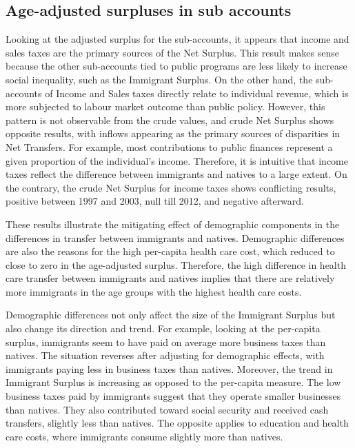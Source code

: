 \subsection{Age-adjusted surpluses in sub accounts}

Looking at the adjusted surplus for the sub-accounts, it appears that income and sales taxes are the primary sources of the Net Surplus.
This result makes sense because the other sub-accounts tied to public programs are less likely to increase social inequality, such as the Immigrant Surplus.
On the other hand, the sub-accounts of Income and Sales taxes directly relate to individual revenue, which is more subjected to labour market outcome than public policy.
However, this pattern is not observable from the crude values, and crude Net Surplus shows opposite results, with inflows appearing as the primary sources of disparities in Net Transfers.
For example, most contributions to public finances represent a given proportion of the individual's income.
Therefore, it is intuitive that income taxes reflect the difference between immigrants and natives to a large extent.
On the contrary, the crude Net Surplus for income taxes shows conflicting results, positive between 1997 and 2003, null till 2012, and negative afterward.

\vspace{0.7em}\par
These results illustrate the mitigating effect of demographic components in the differences in transfer between immigrants and natives.
Demographic differences are also the reasons for the high per-capita health care cost, which reduced to close to zero in the age-adjusted surplus.
Therefore, the high difference in health care transfer between immigrants and natives implies that there are relatively more immigrants in the age groups with the highest health care costs.

\vspace{0.7em}\par
Demographic differences not only affect the size of the Immigrant Surplus but also change its direction and trend.
For example, looking at the per-capita surplus, immigrants seem to have paid on average more business taxes than natives.
The situation reverses after adjusting for demographic effects, with immigrants paying less in business taxes than natives. Moreover, the trend in Immigrant Surplus is increasing as opposed to the per-capita measure.
The low business taxes paid by immigrants suggest that they operate smaller businesses than natives.
They also contributed toward social security and received cash transfers, slightly less than natives.
The opposite applies to education and health care costs, where immigrants consume slightly more than natives.

